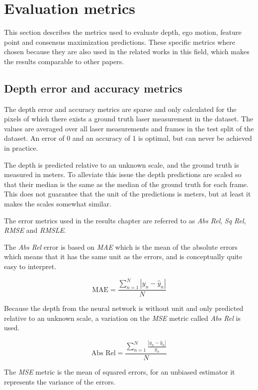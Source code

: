 \section{Evaluation metrics}

This section describes the metrics used to evaluate depth, ego motion, feature point and consensus maximization predictions. These specific metrics where chosen because they are also used in the related works in this field, which makes the results comparable to other papers.

\subsection{Depth error and accuracy metrics}
\label{sec:depthmetrics}

The depth error and accuracy metrics are sparse and only calculated for the pixels of which there exists a ground truth laser measurement in the dataset. The values are averaged over all laser measurements and frames in the test split of the dataset. An error of 0 and an accuracy of 1 is optimal, but can never be achieved in practice.

The depth is predicted relative to an unknown scale, and the ground truth is measured in meters. To alleviate this issue the depth predictions are scaled so that their median is the same as the median of the ground truth for each frame. This does not guarantee that the unit of the predictions is meters, but at least it makes the scales somewhat similar.

The error metrics used in the results chapter are referred to as \textit{Abs Rel}, \textit{Sq Rel}, \textit{RMSE} and \textit{RMSLE}.

The \textit{Abs Rel} error is based on \textit{MAE} which is the mean of the absolute errors which means that it has the same unit as the errors, and is conceptually quite easy to interpret.

\[
\textrm{MAE}=\frac{\sum^N_{n=1}{|y_n-\hat{y}_n|}}{N}
\]

Because the depth from the neural network is without unit and only predicted relative to an unknown scale, a variation on the \textit{MSE} metric called \textit{Abs Rel} is used.

\[
\textrm{Abs Rel}=\frac{\sum^N_{n=1}{\frac{|y_n-\hat{y}_n|}{y_n}}}{N}
\]

The \textit{MSE} metric is the mean of squared errors, for an unbiased estimator it represents the variance of the errors. 

